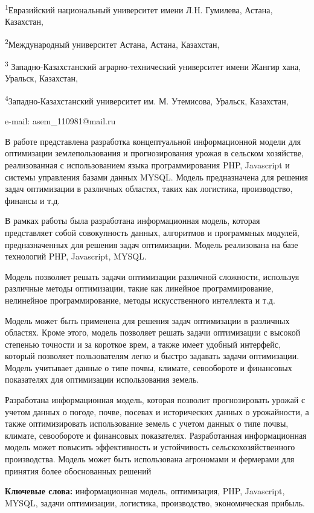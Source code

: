 \textsuperscript{1}Евразийский национальный университет имени Л.Н.
Гумилева, Астана, Казахстан,

\textsuperscript{2}Международный университет Астана, Астана, Казахстан,

\textsuperscript{3} Западно-Казахстанский аграрно-технический
университет имени Жангир хана, Уральск, Казахстан,

\textsuperscript{4}Западно-Казахстанский университет им. М. Утемисова,
Уральск, Казахстан,

e-mail: asem\_110981@mail.ru

В работе представлена разработка концептуальной информационной модели
для оптимизации землепользования и прогнозирования урожая в сельском
хозяйстве, реализованная с использованием языка программирования PHP,
Javascript и системы управления базами данных MYSQL. Модель
предназначена для решения задач оптимизации в различных областях, таких
как логистика, производство, финансы и т.д.

В рамках работы была разработана информационная модель, которая
представляет собой совокупность данных, алгоритмов и программных
модулей, предназначенных для решения задач оптимизации. Модель
реализована на базе технологий PHP, Javascript, MYSQL.

Модель позволяет решать задачи оптимизации различной сложности,
используя различные методы оптимизации, такие как линейное
программирование, нелинейное программирование, методы искусственного
интеллекта и т.д.

Модель может быть применена для решения задач оптимизации в различных
областях. Кроме этого, модель позволяет решать задачи оптимизации с
высокой степенью точности и за короткое врем, а также имеет удобный
интерфейс, который позволяет пользователям легко и быстро задавать
задачи оптимизации. Модель учитывает данные о типе почвы, климате,
севообороте и финансовых показателях для оптимизации использования
земель.

Разработана информационная модель, которая позволит прогнозировать
урожай с учетом данных о погоде, почве, посевах и исторических данных о
урожайности, а также оптимизировать использование земель с учетом данных
о типе почвы, климате, севообороте и финансовых показателях.
Разработанная информационная модель может повысить эффективность и
устойчивость сельскохозяйственного производства. Модель может быть
использована агрономами и фермерами для принятия более обоснованных
решений

\textbf{Ключевые слова:} информационная модель, оптимизация, PHP,
Javascript, MYSQL, задачи оптимизации, логистика, производство,
экономическая прибыль.

